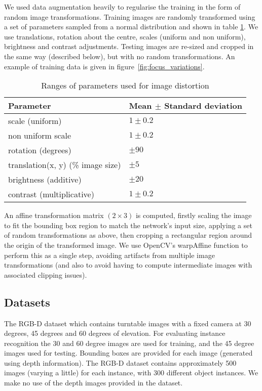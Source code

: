 We used data augmentation heavily to regularise the training in the form of random image transformations. Training images are randomly transformed using a set of parameters sampled from a normal distribution and shown in table \ref{fig:focus_jitter}.  We use translations, rotation about the centre, scales (uniform and non uniform), brightness and contrast adjustments. Testing images are re-sized and cropped in the same way (described below), but with no random transformations. An example of training data is given in figure~\ref{fig:focus_variations}.

\begin{table}[h]
  \centering
    \caption{Ranges of parameters used for image distortion }
    
  \begin{tabular}{ l  l }
    Parameter & Mean $ \pm $ Standard deviation \\
    \toprule
    scale (uniform) & $ 1 \pm 0.2 $  \\ 
    non uniform scale  & $ 1 \pm 0.2 $  \\ 
    rotation (degrees) & $ \pm 90 $ \\ 
    translation(x, y) (\% image size) & $ \pm 5 $ \\ 
    brightness (additive) & $ \pm 20 $ \\ 
    contrast (multiplicative) & $ 1 \pm 0.2 $ \\ 
    \bottomrule
  \end{tabular}
\label{fig:focus_jitter}
\end{table}


An affine transformation matrix $ (2 \times 3) $ is computed, firstly scaling the image to fit the bounding box region to match the network's input size, applying a set of random transformations as above, then cropping a rectangular region around the origin of the transformed image. We use OpenCV's warpAffine function to perform this as a single step, avoiding artifacts from multiple image transformations (and also to avoid having to compute intermediate images with associated clipping issues).

\subsection{Datasets}

The RGB-D \cite{Lai2011} dataset which contains turntable images with a fixed camera at 30 degrees, 45 degrees and 60 degrees of elevation. For evaluating instance recognition the 30 and 60 degree images are used for training, and the 45 degree images used for testing. Bounding boxes are provided for each image (generated using depth information). The RGB-D dataset contains approximately 500 images (varying a little) for each instance, with 300 different object instances. We make no use of the depth images provided in the dataset.

